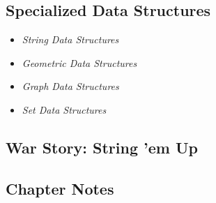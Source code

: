 \subsection{Specialized Data Structures}

\begin{itemize}
	\item \emph{String Data Structures}
	\item \emph{Geometric Data Structures}
	\item \emph{Graph Data Structures}
	\item \emph{Set Data Structures}
\end{itemize}

\subsection{War Story: String 'em Up}

\subsection{Chapter Notes}